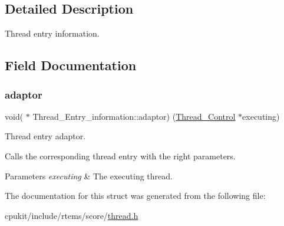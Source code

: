 \subsection{Detailed Description}
Thread entry information. 

\subsection{Field Documentation}
\mbox{\label{structThread__Entry__information_aae83b0a3a7a31870376451587ca2530d}} 
\subsubsection{\texorpdfstring{adaptor}{adaptor}}
{\footnotesize\ttfamily void( $\ast$ Thread\+\_\+\+Entry\+\_\+information\+::adaptor) (\mbox{\hyperlink{struct__Thread__Control}{Thread\+\_\+\+Control}} $\ast$executing)}



Thread entry adaptor. 

Calls the corresponding thread entry with the right parameters.


\begin{DoxyParams}{Parameters}
{\em executing} & The executing thread. \\
\hline
\end{DoxyParams}


The documentation for this struct was generated from the following file\+:\begin{DoxyCompactItemize}
\item 
cpukit/include/rtems/score/\mbox{\hyperlink{score_2thread_8h}{thread.\+h}}\end{DoxyCompactItemize}
